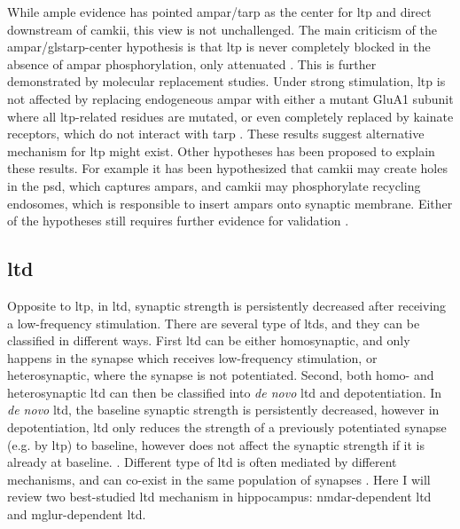 While ample evidence has pointed \gls{ampar}/\gls{tarp} as the center for \gls{ltp} and direct downstream of \gls{camkii}, this view is not unchallenged. The main criticism of the \gls{ampar}/gls{tarp}-center hypothesis is that \gls{ltp} is never completely blocked in the absence of \gls{ampar} phosphorylation, only attenuated \citep{herring16}. This is further demonstrated by molecular replacement studies. Under strong stimulation, \gls{ltp} is not affected by replacing endogeneous \gls{ampar} with either a mutant GluA1 subunit where all \gls{ltp}-related residues are mutated, or even completely replaced by kainate receptors, which do not interact with \gls{tarp} \citep{granger13, chen03}. These results suggest alternative mechanism for \gls{ltp} might exist. Other hypotheses has been proposed to explain these results. For example it has been hypothesized that \gls{camkii} may create holes in the \gls{psd}, which captures \glspl{ampar}, and \gls{camkii} may phosphorylate recycling endosomes, which is responsible to insert \glspl{ampar} onto synaptic membrane. Either of the hypotheses still requires further evidence for validation \citep{herring16}.

\subsection{\gls{ltd}}

Opposite to \gls{ltp}, in \gls{ltd}, synaptic strength is persistently decreased after receiving a low-frequency stimulation. There are several type of \glspl{ltd}, and they can be classified in different ways. First \gls{ltd} can be either homosynaptic, and only happens in the synapse which receives low-frequency stimulation, or heterosynaptic, where the synapse is not potentiated. Second, both homo- and heterosynaptic \gls{ltd} can then be classified into \textit{de novo} \gls{ltd} and depotentiation. In \textit{de novo} \gls{ltd}, the baseline synaptic strength is persistently decreased, however in depotentiation, \gls{ltd} only reduces the strength of a previously potentiated synapse (e.g. by \gls{ltp}) to baseline, however does not affect the synaptic strength if it is already at baseline. \citep{collingridge10}. Different type of \gls{ltd} is often mediated by different mechanisms, and can co-exist in the same population of synapses \citep{collingridge10}. Here I will review two best-studied \gls{ltd} mechanism in hippocampus: \gls{nmdar}-dependent \gls{ltd} and \gls{mglur}-dependent \gls{ltd}.

